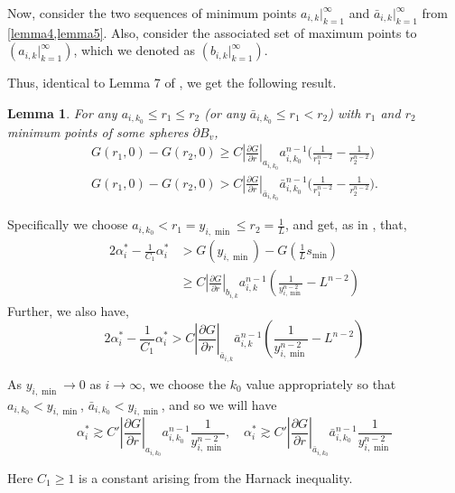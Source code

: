 \documentclass{article}
\newcounter{lem}
\theoremstyle{plain}
\newtheorem{lemma}[theorem]{Lemma}
\theoremstyle{definition}
\theoremstyle{plain}
\begin{document}
Now, consider the two sequences of minimum points $a_{i,k}|_{k=1}^{\infty}$ and $\bar{a}_{i,k}|_{k=1}^{\infty}$ from \cref{lemma4,lemma5}. Also, consider the associated set of maximum points to $(a_{i,k}|_{k=1}^{\infty})$, which we denoted as $(b_{i,k}|_{k=1}^{\infty})$.

Thus, identical to Lemma 7 of \cite{Pat25}, we get the following result.

\begin{lemma} For any $a_{i,k_0} \le r_1 \le r_2$ (or any $\bar{a}_{i,k_0} \le r_1 < r_2$) with $r_1$ and $r_2$ minimum points of some spheres $\partial B_v$,
\begin{align}
G(r_1, 0) - G(r_2, 0) \ge C \left| \frac{\partial G}{\partial r} \right|_{a_{i,k_0}} a_{i,k_0}^{n-1} \Big( \frac{1}{r_1^{n-2}} - \frac{1}{r_2^{n-2}} \Big) \\
 G(r_1, 0) - G(r_2, 0)> C \left| \frac{\partial G}{\partial r} \right|_{\bar{a}_{i,k_0}} \bar{a}_{i,k_0}^{n-1}  \Big(\frac{1}{r_1^{n-2}} - \frac{1}{r_2^{n-2}}\Big).
\end{align}
\end{lemma}
\bigskip
Specifically we choose $a_{i,k_0} < r_1 = y_{i, \min} \le r_2 = \frac{1}{L}$, and get, as in \cite{Pat25}, that,
\begin{align}
2\alpha_i^* - \frac{1}{C_1} \alpha_i^* &> G(y_{i, \min}) - G(\frac{1}{L} s_{\min}) \\
&\ge C \left| \frac{\partial G}{\partial r} \right|_{b_{i,k}} a_{i,k}^{n-1} \left( \frac{1}{y_{i, \min}^{n-2}} - L^{n-2} \right) 
\end{align}
Further, we also have,
\begin{equation} \label{eq31}
2\alpha_{i}^* - \frac{1}{C_1} \alpha_{i}^{*}> C \left| \frac{\partial G}{\partial r} \right|_{\bar{a}_{i,k}} \bar{a}_{i,k}^{n-1} \left( \frac{1}{y_{i, \min}^{n-2}} - L^{n-2} \right)
\end{equation}

As $y_{i, \min} \to 0$ as $i \to \infty$, we choose the $k_0$ value appropriately so that $a_{i,k_0} < y_{i, \min}$, $\bar{a}_{i,k_0} < y_{i, \min}$, and so we will have
\begin{equation*}
\alpha_i^* \gtrsim C' \left| \frac{\partial G}{\partial r} \right|_{a_{i,k_0}} a_{i,k_0}^{n-1} \frac{1}{y_{i, \min}^{n-2}}, \quad \alpha_{i}^{*} \gtrsim C' \left| \frac{\partial G}{\partial r} \right|_{\bar{a}_{i,k_0}} \bar{a}_{i,k_0}^{n-1} \frac{1}{y_{i, \min}^{n-2}}
\end{equation*}

Here $C_1 \ge 1$ is a constant arising from the Harnack inequality.
\end{document}
